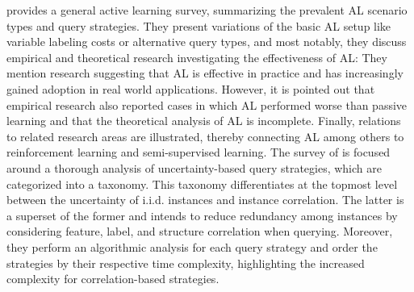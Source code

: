 \textcite{settles2010active} provides a general active learning survey, 
summarizing the prevalent AL scenario types and query strategies.
They present variations of the basic AL setup like 
 variable labeling costs or alternative query types, 
and most notably, they discuss empirical and theoretical research investigating the effectiveness of AL: 
They mention research suggesting that AL is effective in practice 
and has increasingly gained adoption in real world applications. However, it is pointed out that empirical research also reported cases in which AL performed worse than passive learning and that the theoretical analysis of AL is incomplete.
Finally, relations to related research areas are illustrated, thereby connecting AL among others to reinforcement learning and semi-supervised learning.
The survey of \textcite{fu2013survey} is focused around a thorough analysis of uncertainty-based query strategies, which are categorized into a taxonomy.
This taxonomy differentiates at the topmost level between the uncertainty of i.i.d. instances and instance correlation. The latter is a superset of the former 
and intends to reduce redundancy among instances by considering feature, label, and structure correlation when querying.
Moreover, they perform an algorithmic analysis for each query strategy 
and order the strategies by their respective time complexity, highlighting the increased complexity for correlation-based strategies.

